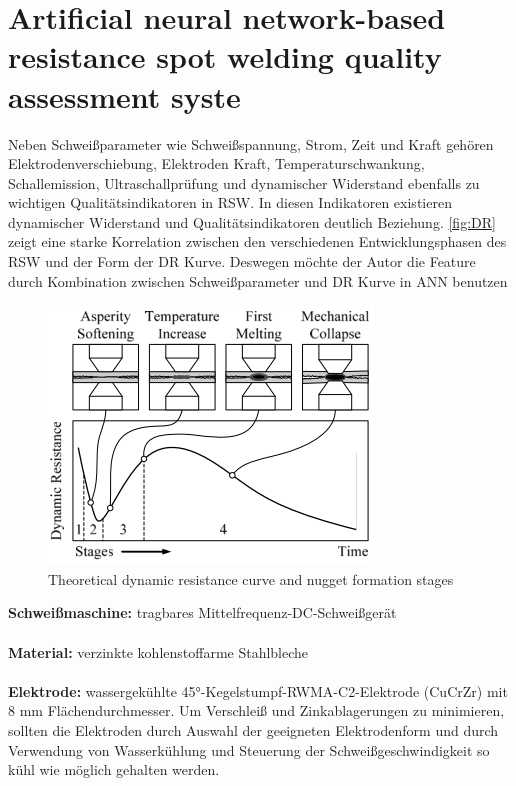\documentclass[english,ngerman]{tudscrreprt}
\begin{document}
\newpage

\section{Artificial neural network-based resistance spot welding quality assessment syste\cite{ElOuafi.2011b}}
Neben Schweißparameter wie Schweißspannung, Strom, Zeit und Kraft gehören Elektrodenverschiebung, Elektroden Kraft, Temperaturschwankung, Schallemission, Ultraschallprüfung und dynamischer Widerstand ebenfalls zu wichtigen Qualitätsindikatoren in RSW. In diesen Indikatoren existieren dynamischer Widerstand und Qualitätsindikatoren deutlich Beziehung. \autoref{fig:DR} zeigt eine starke Korrelation zwischen den verschiedenen Entwicklungsphasen des RSW und der Form der DR Kurve.
Deswegen möchte der Autor die Feature durch Kombination zwischen Schweißparameter und DR Kurve in ANN benutzen 
\begin{figure}[H]
\centering
\includegraphics{./Bilder/Theoretical dynamic resistance curve and nugget formation stages.png}
\caption{Theoretical dynamic resistance curve and nugget formation stages}\label{fig:DR}
\end{figure}
\noindent
\textbf{Schweißmaschine: }tragbares Mittelfrequenz-DC-Schweißgerät\\
\\
\textbf{Material: }verzinkte kohlenstoffarme Stahlbleche\\
\\
\textbf{Elektrode: }wassergekühlte 45°-Kegelstumpf-RWMA-C2-Elektrode (CuCrZr) mit 8 mm Flächendurchmesser. Um Verschleiß und Zinkablagerungen zu minimieren, sollten die Elektroden durch Auswahl der geeigneten Elektrodenform und durch Verwendung von Wasserkühlung und Steuerung der Schweißgeschwindigkeit so kühl wie möglich gehalten werden.\\
\\
\end{document}
